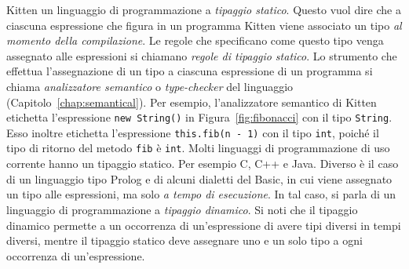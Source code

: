 Kitten \e un linguaggio di programmazione a \emph{tipaggio statico}.
Questo vuol dire che a ciascuna espressione che figura in un programma Kitten
viene associato un tipo \emph{al momento della compilazione}. Le regole che
specificano come questo tipo venga assegnato alle espressioni si chiamano
\emph{regole di tipaggio statico}. Lo strumento che effettua l'assegnazione
di un tipo a ciascuna espressione di un programma si chiama
\emph{analizzatore semantico} o \emph{type-checker}
del linguaggio (Capitolo~\ref{chap:semantical}). Per esempio, l'analizzatore
semantico di Kitten etichetta l'espressione \texttt{new String()} in
Figura~\ref{fig:fibonacci} con il tipo \texttt{String}. Esso inoltre
etichetta l'espressione \texttt{this.fib(n - 1)} con il tipo \texttt{int},
poich\'e il tipo di ritorno del metodo \texttt{fib} \`e \texttt{int}.
Molti linguaggi di programmazione di uso corrente hanno un tipaggio statico.
Per esempio C, C++ e Java. Diverso \`e il caso di un linguaggio tipo Prolog
e di alcuni dialetti del Basic,
in cui viene assegnato un tipo alle espressioni, ma solo
\emph{a tempo di esecuzione}. In tal caso, si parla di un linguaggio di
programmazione a \emph{tipaggio dinamico}. Si noti che il tipaggio dinamico
permette a un occorrenza di un'espressione di avere tipi diversi in tempi diversi, mentre
il tipaggio statico deve assegnare uno e un solo tipo a ogni occorrenza di un'espressione.

